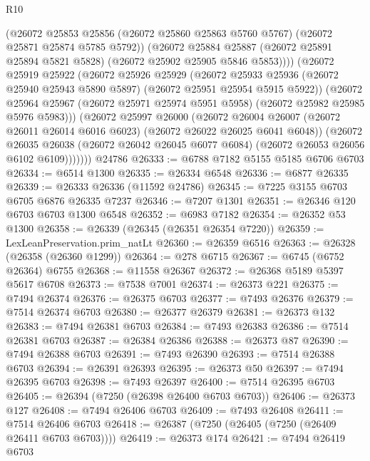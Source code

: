 \begin{lexlean}{R10}
\begin{coremodule}
{{{{{{{{{{{{{{{{{{{{{{{{{{{{{{{{{{{{{{{{{{{{{{{{{{{{{{{{{{{{{{{{{{{{{{{{{{{{{{{{{{{{              (@26072
                @25853
                @25856
                (@26072 @25860 @25863 @5760 @5767)
                (@26072 @25871 @25874 @5785 @5792))
              (@26072
                @25884
                @25887
                (@26072 @25891 @25894 @5821 @5828)
                (@26072 @25902 @25905 @5846 @5853))))
          (@26072
            @25919
            @25922
            (@26072
              @25926
              @25929
              (@26072
                @25933
                @25936
                (@26072 @25940 @25943 @5890 @5897)
                (@26072 @25951 @25954 @5915 @5922))
              (@26072
                @25964
                @25967
                (@26072 @25971 @25974 @5951 @5958)
                (@26072 @25982 @25985 @5976 @5983)))
            (@26072
              @25997
              @26000
              (@26072
                @26004
                @26007
                (@26072 @26011 @26014 @6016 @6023)
                (@26072 @26022 @26025 @6041 @6048))
              (@26072
                @26035
                @26038
                (@26072 @26042 @26045 @6077 @6084)
                (@26072 @26053 @26056 @6102 @6109)))))))
    @24786
@26333 := @6788 @7182 @5155 @5185 @6706 @6703
@26334 := @6514 @1300
@26335 := @26334 @6548
@26336 := @6877 @26335
@26339 := @26333 @26336 (@11592 @24786)
@26345 := @7225 @3155 @6703 @6705 @6876 @26335 @7237
@26346 := @7207 @1301
@26351 := @26346 @120 @6703 @6703 @1300 @6548
@26352 := @6983 @7182
@26354 := @26352 @53 @1300
@26358 := @26339 (@26345 (@26351 @26354 @7220))
@26359 := LexLeanPreservation.prim_natLt
@26360 := @26359 @6516
@26363 := @26328 (@26358 (@26360 @1299))
@26364 := @278 @6715
@26367 := @6745 (@6752 @26364) @6755
@26368 := @11558 @26367
@26372 := @26368 @5189 @5397 @5617 @6708
@26373 := @7538 @7001
@26374 := @26373 @221
@26375 := @7494 @26374
@26376 := @26375 @6703
@26377 := @7493 @26376
@26379 := @7514 @26374 @6703
@26380 := @26377 @26379
@26381 := @26373 @132
@26383 := @7494 @26381 @6703
@26384 := @7493 @26383
@26386 := @7514 @26381 @6703
@26387 := @26384 @26386
@26388 := @26373 @87
@26390 := @7494 @26388 @6703
@26391 := @7493 @26390
@26393 := @7514 @26388 @6703
@26394 := @26391 @26393
@26395 := @26373 @50
@26397 := @7494 @26395 @6703
@26398 := @7493 @26397
@26400 := @7514 @26395 @6703
@26405 := @26394 (@7250 (@26398 @26400 @6703 @6703))
@26406 := @26373 @127
@26408 := @7494 @26406 @6703
@26409 := @7493 @26408
@26411 := @7514 @26406 @6703
@26418 := @26387 (@7250 (@26405 (@7250 (@26409 @26411 @6703 @6703))))
@26419 := @26373 @174
@26421 := @7494 @26419 @6703
}}}}}}}}}}}}}}}}}}}}}}}}}}}}}}}}}}}}}}}}}}}}}}}}}}}}}}}}}}}}}}}}}}}}}}}}}}}}}}}}}}}}
\end{coremodule}
\end{lexlean}
